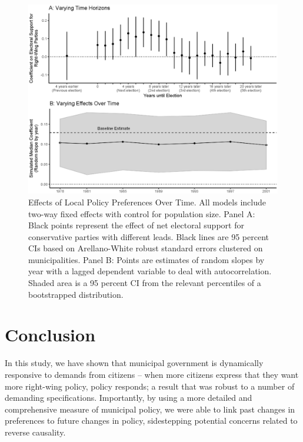 \documentclass[a4paper,12pt]{article}
\begin{document}
\begin{figure}[htbp]
	\centering
	\includegraphics[scale = .6]{EffectsVsTime.eps}
	\caption{Effects of Local Policy Preferences Over Time. All models include two-way fixed effects with control for population size. Panel A: Black points represent the effect of net electoral support for conservative parties with different leads. Black lines are 95 percent CIs based on Arellano-White robust standard errors clustered on municipalities. Panel B: Points are estimates of random slopes by year with a lagged dependent variable to deal with autocorrelation. Shaded area is a 95 percent CI from the relevant percentiles of a bootstrapped distribution.}
	\label{fig:LongRun}
\end{figure}








\section*{Conclusion}

In this study, we have shown that municipal government is dynamically responsive to demands from citizens -- when more citizens express that they want more right-wing policy, policy responds; a result that was robust to a number of demanding specifications. Importantly, by using a more detailed and comprehensive measure of municipal policy, we were able to link past changes in preferences to future changes in policy, sidestepping potential concerns related to reverse causality. 
\end{document}
